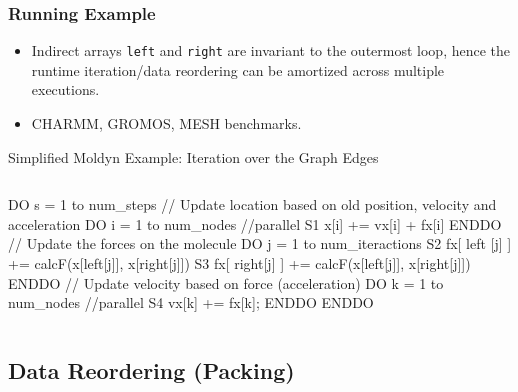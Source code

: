 \documentclass{beamer}
\newcommand{\emphh}[1]{\textcolor{CosGreen}{ #1}}
\begin{document}
\begin{frame}[fragile,t]
  \frametitle{Running Example}


\begin{itemize}
    \item Indirect arrays {\tt left} and {\tt right} are invariant
            to the outermost loop, hence the runtime iteration/data reordering
            can be amortized across multiple executions.
    \item CHARMM, GROMOS, MESH benchmarks.
\end  {itemize}


\begin{block}{Simplified Moldyn Example: Iteration over the Graph Edges}
\begin{columns}
\begin{colorcode}
  DO s = 1 to num_steps
    // Update location based on old position, velocity and acceleration
    DO i = 1 to num_nodes \emphh{//parallel}
S1    x[i] += vx[i] + fx[i]
    ENDDO
    // Update the forces on the molecule
    DO j = 1 to num_iteractions
S2    fx[ left [j] ] += calcF(x[left[j]], x[right[j]])
S3    fx[ right[j] ] += calcF(x[left[j]], x[right[j]])
    ENDDO
    // Update velocity based on force (acceleration)
    DO k = 1 to num_nodes \emphh{//parallel}
S4    vx[k] += fx[k];
    ENDDO
ENDDO
\end{colorcode}

\end{columns}
\end{block} 
 
\end{frame}


\subsection{Data Reordering (Packing)}
\end{document}
